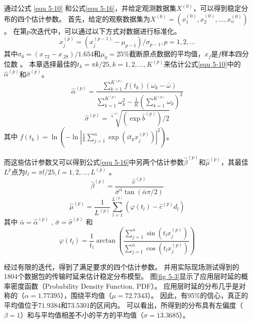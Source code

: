 通过公式 \ref{equ 5-10} 和公式\ref{equ 5-16}，并给定观测数据集$X^{(0)}$，可以得到稳定分布的四个估计参数。
首先，给定的观察数据集为$X^{(0)}=(x_1^{(0)}, x_2^{(0)}, \ldots, x_n^{(0)})$。
在第$p$次迭代中，可以通过以下方式对数据进行标准化。
\begin{equation}
x_{j}^{(p)}=\left(x_{j}^{(p-1)}-\mu_{p-1}\right) / \sigma_{p-1}, p = 1,2,\ldots
\end{equation}
其中${\sigma_{0}=\left(x_{.72}-x_{.28}\right) / 1.654}$和$\mu_{0}=25 \%$截断原点数据的平均值，$x_{f}$是$f$样本四分位数 \cite{fama1971parameter}。
本章选择最佳的$t_{k}=\pi k / 25, k=1,2,\ldots,K^{(p)}$\cite{koutrouvelis1980regression}来估计公式\ref{equ 5-10}中的$\hat{\alpha}^{(p)}$和$\hat{\sigma}^{(p)}$。
\begin{equation}
	{\hat{\alpha}^{(p)}=\frac{ \sum_{k=1}^{K^{(p)}} f\left(t_{k}\right)\left(\omega_{k}-\bar{\omega}\right)}{\sum_{k=1}^{K^{(p)}} \omega_{k}^{2}-\frac{1}{K}\left(\sum_{k=1}^{K^{(p)}} \omega_{k}\right)^{2}} } 
\end{equation}
\begin{equation}
	{\hat{\sigma}^{(p)}=\sqrt[\hat{\alpha}^{(p)}]{ (\exp \hat{b}^{(p)}) / 2}}
\end{equation}
其中 $f\left(t_{k}\right) = \ln \left(-\ln \left|\frac{1}{n} \sum_{j=1}^{n} \exp \left(i t_{k} x_{j}^{(p)}\right)\right|^{2}\right)$。

而这些估计参数又可以得到公式\ref{equ 5-16}中另两个估计参数$\hat{\beta}^{(p)}$和$\hat{\mu}^{(p)}$，其最佳$L^{p}$点为$t_{l}=\pi l / 25, l=1,2,\ldots,L^{(p)}$ \cite{koutrouvelis1980regression}。
\begin{equation}
\hat{\beta}^{(p)}= \frac{\hat{c}^{(p)}}{\bar{\sigma}^{\bar{\alpha}} \tan (\bar{\alpha} \pi / 2)}
\end{equation}
\begin{equation}
\hat{\mu}^{(p)}= \frac{1}{L^{(p)}} \sum_{l=1}^{L^{(p)}}\left(\varphi\left(t_{l}\right)-\hat{c}^{(p)} d_{l}\right)
\end{equation}
其中 $\bar{\alpha} =  {\hat{\alpha}^{(p)}}$ , $\bar{\sigma} =  {\hat{\sigma}^{(p)}}$ 和 
\begin{equation}
\varphi\left(t_{l}\right) = \frac{1}{t_{l}} \arctan \left(\frac{ \sum_{j=1}^{n} \sin \left(t_l x_{j}^{(p)}\right)}{\sum_{j=1}^{n} \cos \left(t_l x_{j}^{(p)}\right)}\right)
\end{equation}

经过有限的迭代，得到了满足要求的四个估计参数。
并用实际现场测试得到的1804个数据包的传输时延来估计稳定分布模型。
图\ref{fig 5-3}显示了应用层时延的概率密度函数（Probability Density Function, PDF）。
应用层时延的分布几乎是对称的（$\alpha = 1.77395$），围绕平均值（$\mu = 72.7343$）。
因此，有95\%的信心，真正的平均值位于$71.9384$和$73.5301$的区间内。
可以看出，所得到的分布具有左偏度（$\beta = 1$）和与平均值相差不小的平方的平均值（$\sigma = 13.3685$）。

